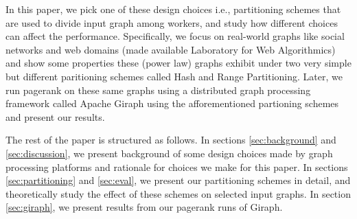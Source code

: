 In this paper, we pick one of these design choices i.e., partitioning schemes that are
used to divide input graph among workers, and study how different choices can affect the performance.
Specifically, we focus on real-world graphs like social networks and web domains (made available 
Laboratory for Web Algorithmics\cite{BoVWFI}\cite{BRSLLP}) and show some properties these (power law) 
graphs exhibit under two very simple but different paritioning schemes called Hash and Range Partitioning. 
Later, we run pagerank on these same graphs using a distributed graph processing framework 
called Apache Giraph\cite{ApacheGiraph} using the afforementioned partioning schemes and 
present our results.

The rest of the paper is structured as follows. In sections \ref{sec:background} and \ref{sec:discussion},
we present background of some design choices made by graph processing platforms and rationale for 
choices we make for this paper. In sections \ref{sec:partitioning} and \ref{sec:eval}, we present 
our partitioning schemes in detail, and theoretically study the effect of these schemes on selected 
input graphs. In section \ref{sec:giraph}, we present results from our pagerank runs of Giraph. 


